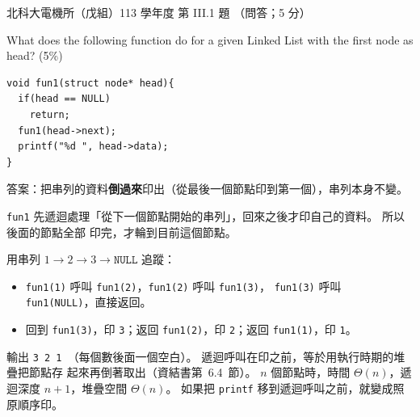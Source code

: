 \begin{pastexam}[label={px:ntut-113-ee-ds-10}]{北科大電機所（戊組）113 學年度 第 III.1 題}
（問答；5 分）

What does the following function do for a given Linked List with the first node as head? (5\%)
\begin{verbatim}
void fun1(struct node* head){
  if(head == NULL)
    return;
  fun1(head->next);
  printf("%d ", head->data);
}
\end{verbatim}
\end{pastexam}

\begin{pastsoln}
答案：把串列的資料\textbf{倒過來}印出（從最後一個節點印到第一個），串列本身不變。

\texttt{fun1} 先遞迴處理「從下一個節點開始的串列」，回來之後才印自己的資料。 所以後面的節點全部
印完，才輪到目前這個節點。

用串列 $1 \to 2 \to 3 \to \texttt{NULL}$ 追蹤：
\begin{itemize}
\item \texttt{fun1(1)} 呼叫 \texttt{fun1(2)}，\texttt{fun1(2)} 呼叫 \texttt{fun1(3)}，
\texttt{fun1(3)} 呼叫 \texttt{fun1(NULL)}，直接返回。
\item 回到 \texttt{fun1(3)}，印 \texttt{3}；返回 \texttt{fun1(2)}，印 \texttt{2}；返回
\texttt{fun1(1)}，印 \texttt{1}。
\end{itemize}
輸出 \texttt{3 2 1 }（每個數後面一個空白）。 遞迴呼叫在印之前，等於用執行時期的堆疊把節點存
起來再倒著取出（資結書第~6.4~節）。 $n$ 個節點時，時間 $\Theta(n)$，遞迴深度 $n + 1$，堆疊空間
$\Theta(n)$。 如果把 \texttt{printf} 移到遞迴呼叫之前，就變成照原順序印。
\end{pastsoln}
